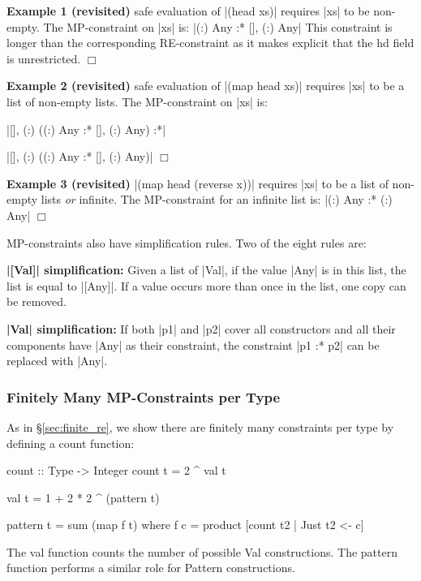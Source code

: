 \documentclass[preprint]{sigplanconf}
\newcommand{\C}[1]{\textsf{#1}}
\newcommand{\noexample}{\hfill$\Box$\par\addvspace{2mm}}
\newcommand{\para}[1]{\vspace{2mm}\noindent\textbf{#1}}
\newenvironment{revisit}[1]
    {\addvspace{2mm}\noindent\textbf{Example #1 (revisited)}}
    {\noexample}
\begin{document}
\begin{revisit}{1} safe evaluation of |(head xs)| requires |xs| to be non-empty. The MP-constraint on |xs| is: |{(:) Any} :* {[], (:) Any}| This constraint is longer than the corresponding RE-constraint as it makes explicit that the \C{hd} field is unrestricted.
\end{revisit}

\begin{revisit}{2} safe evaluation of |(map head xs)| requires |xs| to be a list of non-empty lists. The MP-constraint on |xs| is:

\smallskip
\par\noindent |{[], (:) ({(:) Any} :* {[], (:) Any})} :*|
\par\noindent |{[], (:) ({(:) Any} :* {[], (:) Any})}|
\end{revisit}

\begin{revisit}{3} |(map head (reverse x))| requires |xs| to be a list of non-empty lists \textit{or} infinite. The MP-constraint for an infinite list is: |{(:) Any} :* {(:) Any}|
\end{revisit}

MP-constraints also have simplification rules.  Two of the eight rules are:

\para{|[Val]| simplification:} Given a list of |Val|, if the value |Any| is in this list, the list is equal to |[Any]|. If a value occurs more than once in the list, one copy can be removed.

\para{|Val| simplification:} If both |p1| and |p2| cover all constructors and all their components have |Any| as their constraint, the constraint |p1 :* p2| can be replaced with |Any|.


\subsubsection{Finitely Many MP-Constraints per Type}

As in \S\ref{sec:finite_re}, we show there are finitely many constraints per type by defining a \C{count} function:

\begin{code}
count :: Type -> Integer
count t = 2 ^ val t

val t = 1 + 2 * 2 ^ (pattern t)

pattern t = sum (map f t)
    where f c = product [count t2 | Just t2 <- c]
\end{code}

The \C{val} function counts the number of possible \C{Val} constructions. The \C{pattern} function performs a similar role for \C{Pattern} constructions.
\end{document}
